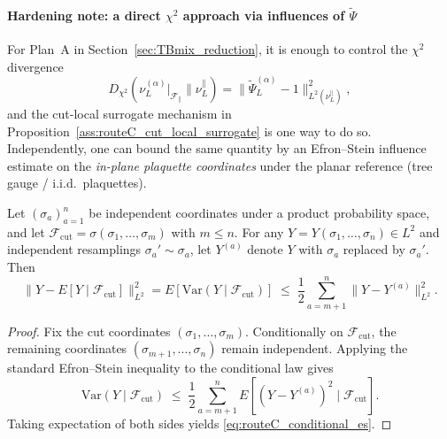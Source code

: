\paragraph*{Hardening note: a direct $\chi^2$ approach via influences of $\widetilde{\Psi}$}

For Plan~A in Section~\ref{sec:TBmix_reduction}, it is enough to control the $\chi^2$ divergence
\[
D_{\chi^2}\!\left(\nu_L^{(\alpha)}\big|_{\mathscr F_{\parallel}}\Big\| \nu_L^{\parallel}\right)
=
\big\|\widetilde{\Psi}_L^{(\alpha)}-1\big\|_{L^2(\nu_L^{\parallel})}^2,
\]
and the cut-local surrogate mechanism in Proposition~\ref{ass:routeC_cut_local_surrogate}
is one way to do so.
Independently, one can bound the same quantity by an Efron--Stein influence estimate on the
\emph{in-plane plaquette coordinates} under the planar reference (tree gauge / i.i.d.\ plaquettes).

\begin{lemma}\label{lem:routeC_conditional_efronstein}
Let $(\sigma_a)_{a=1}^{n}$ be independent coordinates under a product probability space, and let
$\mathscr F_{\mathrm{cut}}=\sigma(\sigma_1,\dots,\sigma_m)$ with $m\le n$.
For any $Y=Y(\sigma_1,\dots,\sigma_n)\in L^2$ and independent resamplings $\sigma_a'\sim\sigma_a$,
let $Y^{(a)}$ denote $Y$ with $\sigma_a$ replaced by $\sigma_a'$.
Then
\begin{equation}\label{eq:routeC_conditional_es}
\big\|Y-E[Y\mid \mathscr F_{\mathrm{cut}}]\big\|_{L^2}^2
=
E\!\left[\mathrm{Var}(Y\mid \mathscr F_{\mathrm{cut}})\right]
\;\le\;
\frac12\sum_{a=m+1}^{n}\big\|Y-Y^{(a)}\big\|_{L^2}^2.
\end{equation}

\begin{proof}
Fix the cut coordinates $(\sigma_1,\dots,\sigma_m)$.
Conditionally on $\mathscr F_{\mathrm{cut}}$, the remaining coordinates $(\sigma_{m+1},\dots,\sigma_n)$ remain independent.
Applying the standard Efron--Stein inequality to the conditional law gives
\[
\mathrm{Var}(Y\mid \mathscr F_{\mathrm{cut}})
\;\le\;
\frac12\sum_{a=m+1}^{n}E\!\left[(Y-Y^{(a)})^2\mid \mathscr F_{\mathrm{cut}}\right].
\]
Taking expectation of both sides yields \eqref{eq:routeC_conditional_es}.
\end{proof}

\end{lemma}

